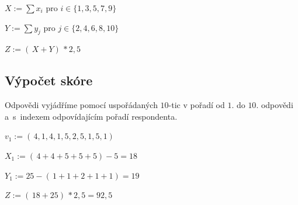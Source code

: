 \documentclass[12pt,a4paper]{report}
\let\openright=\clearpage
\begin{document}
$X := \sum x_i$ pro $i \in \{1,3,5,7,9\}$

$Y := \sum y_j$ pro $j \in \{2,4,6,8,10\}$

$Z := ( \,X + Y) \, \ast 2,5$

\subsection{Výpočet skóre}

Odpovědi vyjádříme pomocí uspořádaných $10$-tic v pořadí od $1$. do $10$. odpovědi a~s~indexem odpovídajícím pořadí respondenta.

$v_1 := (\,4,1,4,1,5,2,5,1,5,1)\,$

$X_1 := (\,4 + 4 + 5 + 5 + 5) - 5 = 18\,$

$Y_1 := 25 - (\,1 + 1 + 2 + 1 + 1) = 19\,$

$Z := ( \,18 + 25) \, \ast 2,5 = 92,5$

\openright
\end{document}
